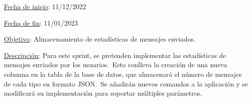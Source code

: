 
\underline{Fecha de inicio}: 11/12/2022

\underline{Fecha de fin}: 11/01/2023

\underline{Objetivo}:
Almacenamiento de estadísticas de mensajes enviados.

\underline{Descripción}:
Para este sprint, se pretenden implementar las estadísticas de mensajes enviados por los usuarios.\ Esto conlleva la
creación de una nueva columna en la tabla  de la base de datos, que almacenará el número de mensajes
de cada tipo en formato JSON\@.\ Se añadirán nuevos comandos a la aplicación y se modificará su implementación
para soportar múltiples parámetros.
